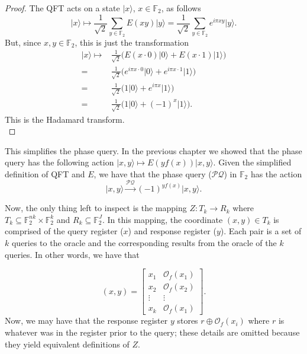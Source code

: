 \documentclass[12pt,twoside]{reedthesis}
\theoremstyle{definition}
\newlength{\arrow}
\newcommand{\F}{\mathbb{F}}
\newcommand{\ket}[1]{\ensuremath{\lvert #1\rangle}\xspace}
\begin{document}
\begin{proof}
The QFT acts on a state $\ket{x}$, $x\in \F_2$, as follows
\begin{equation*}
\ket{x}  \longmapsto \frac{1}{\sqrt{2}}\sum_{y\in \F_2} E(xy)\ket{y}
=  \frac{1}{\sqrt{2}}\sum_{y\in \F_2} e^{i\pi xy}\ket{y}.
\end{equation*}
But, since $x,y \in \F_2$, this is just the transformation
\begin{align*}
\ket{x}  \longmapsto 
&\frac{1}{\sqrt{2}}\bigg( E(x\cdot 0)\ket{0} + E(x\cdot 1)\ket{1} \bigg) \\
 = &  \frac{1}{\sqrt{2}}\bigg( e^{i\pi x\cdot 0}\ket{0} + e^{i\pi x\cdot 1}\ket{1} \bigg) \\
 = & \frac{1}{\sqrt{2}}\bigg( 1\ket{0} + e^{i\pi x}\ket{1} \bigg) \\
 = & \frac{1}{\sqrt{2}}\bigg( 1\ket{0} + (-1)^x\ket{1} \bigg). 
\end{align*}
This is the Hadamard transform. \\
\end{proof}

This simplifies the phase query. In the previous chapter we showed that the phase query has the following action $\ket{x,y} \mapsto E(yf(x))\ket{x,y}$. Given the simplified definition of QFT and $E$, we have that the phase query ($\mathcal{PQ}$) in $\F_2$ has the action
\begin{equation}
\ket{x,y} \xrightarrow{\mathcal{PQ}} (-1)^{yf(x)} \ket{x,y}.
\end{equation}

Now, the only thing left to inspect is the mapping $Z: T_k \rightarrow R_k$ where $T_k \subseteq \F_2^{nk} \times \F_2^k$ and $R_k \subseteq \F_2^J$. In this mapping, the coordinate $(x,y) \in T_k$ is comprised of the query register ($x$) and response register ($y$). Each pair is a set of $k$ queries to the oracle and the corresponding results from the oracle of the $k$ queries. In other words, we have that

\begin{equation*}
(x, y) =
\begin{bmatrix}
x_1 & \mathcal{O}_f(x_1) \\
x_2 & \mathcal{O}_f(x_2)\\
\vdots & \vdots \\
x_k & \mathcal{O}_f(x_1)
\end{bmatrix}.
\end{equation*}
Now,  we may have that the response register $y$ stores $r \oplus \mathcal{O}_f(x_i)$  where $r$ is whatever was in the register prior to the query; these details are omitted because they yield equivalent definitions of $Z$.
\end{document}
